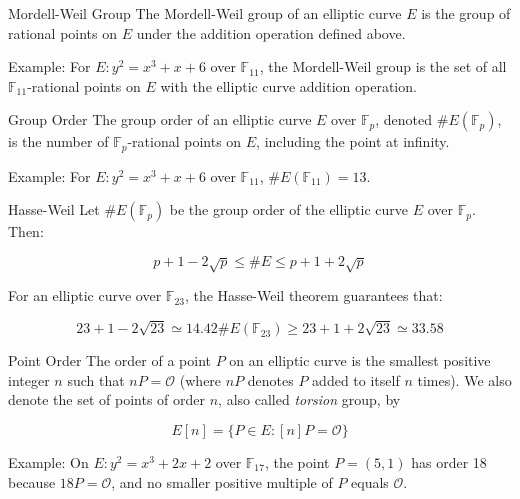 \documentclass{article}
\begin{document}
\begin{definition}{Mordell-Weil Group}{}
The Mordell-Weil group of an elliptic curve $E$ is the group of rational points on $E$ under the addition operation defined above.
\end{definition}

Example: For $E: y^2 = x^3 + x + 6$ over $\mathbb{F}_{11}$, the Mordell-Weil group is the set of all $\mathbb{F}_{11}$-rational points on $E$ with the elliptic curve addition operation.

\begin{definition}{Group Order}{}
The group order of an elliptic curve $E$ over $\mathbb{F}_{p}$, denoted $\#E(\mathbb{F}_{p})$, is the number of $\mathbb{F}_{p}$-rational points on $E$, including the point at infinity.
\end{definition}
Example: For $E: y^2 = x^3 + x + 6$ over $\mathbb{F}_{11}$, $\#E(\mathbb{F}_{11}) = 13$.

\begin{theorem}{Hasse-Weil}{}
Let $\#E(\mathbb{F}_{p})$ be the group order of the elliptic curve $E$ over $\mathbb{F}_{p}$. Then:

        \begin{equation}
            p + 1 - 2 \sqrt{p} \leq \#E \leq p + 1 + 2 \sqrt{p}
        \end{equation}
\end{theorem}

For an elliptic curve over $\mathbb{F}_{23}$, the Hasse-Weil theorem guarantees that: 

\begin{equation*}
23 + 1 - 2 \sqrt{23} \simeq 14.42 \#E(\mathbb{F}_{23}) \geq 23 + 1 + 2 \sqrt{23} \simeq 33.58
\end{equation*}

\begin{definition}{Point Order}{}
The order of a point $P$ on an elliptic curve is the smallest positive integer $n$ such that $nP = \mathcal{O}$ (where $nP$ denotes $P$ added to itself $n$ times). We also denote the set of points of order $n$, also called \textit{torsion} group, by 

\begin{equation}
    E[n] = \{P \in E: [n]P = \mathcal{O}\}
\end{equation}
\end{definition}

Example: On $E: y^2 = x^3 + 2x + 2$ over $\mathbb{F}_{17}$, the point $P = (5, 1)$ has order 18 because $18P = \mathcal{O}$, and no smaller positive multiple of $P$ equals $\mathcal{O}$.
\end{document}
